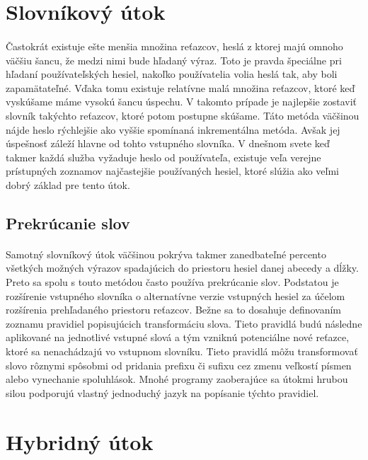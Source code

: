 \section{Slovníkový útok}
\paragraph{}
Častokrát existuje ešte menšia množina reťazcov, heslá z ktorej majú omnoho väčšiu šancu, že medzi nimi bude hľadaný výraz. Toto je pravda špeciálne pri hľadaní používateľských hesiel, nakoľko používatelia volia heslá tak, aby boli zapamätateľné. Vďaka tomu existuje relatívne malá množina reťazcov, ktoré keď vyskúšame máme vysokú šancu úspechu. V takomto prípade je najlepšie zostaviť slovník takýchto reťazcov, ktoré potom postupne skúšame. Táto metóda väčšinou nájde heslo rýchlejšie ako vyššie spomínaná inkrementálna metóda. Avšak jej úspešnosť záleží hlavne od tohto vstupného slovníka. V dnešnom svete keď takmer každá služba vyžaduje heslo od používateľa, existuje veľa verejne prístupných zoznamov najčastejšie používaných hesiel, ktoré slúžia ako veľmi dobrý základ pre tento útok.

\subsection{Prekrúcanie slov}
\paragraph{}
Samotný slovníkový útok väčšinou pokrýva takmer zanedbateľné percento všetkých možných výrazov spadajúcich do priestoru hesiel danej abecedy a dĺžky. Preto sa spolu s touto metódou často používa prekrúcanie slov. Podstatou je rozšírenie vstupného slovníka o alternatívne verzie vstupných hesiel za účelom rozšírenia prehľadaného priestoru reťazcov. Bežne sa to dosahuje definovaním zoznamu pravidiel popisujúcich transformáciu slova. Tieto pravidlá budú následne aplikované na jednotlivé vstupné slová a tým vzniknú potenciálne nové reťazce, ktoré sa nenachádzajú vo vstupnom slovníku. Tieto pravidlá môžu transformovať slovo rôznymi spôsobmi od pridania prefixu či sufixu cez zmenu veľkostí písmen alebo vynechanie spoluhlások. Mnohé programy zaoberajúce sa útokmi hrubou silou podporujú vlastný jednoduchý jazyk na popísanie týchto pravidiel.

\section{Hybridný útok}
